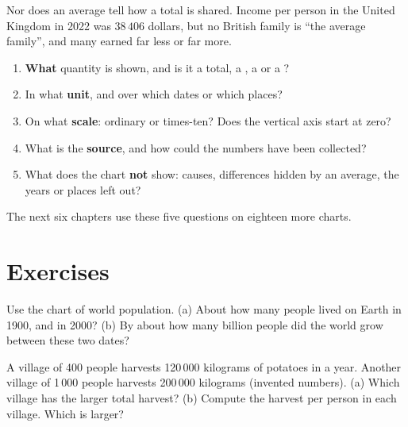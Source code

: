 Nor does an average tell how a total is shared. Income per person in the
United Kingdom in 2022 was $38\,406$ dollars, but no British family is
``the average family'', and many earned far less or far more.

\begin{method}\label{met:g6:reading-economic-charts:five}
\begin{enumerate}
  \item \textbf{What} quantity is shown, and is it a total, a , a  or a ?
  \item In what \textbf{unit}, and over which dates or which places?
  \item On what \textbf{scale}: ordinary or times-ten? Does the vertical axis
        start at zero?
  \item What is the \textbf{source}, and how could the numbers have been
        collected?
  \item What does the chart \textbf{not} show: causes, differences hidden by
        an average, the years or places left out?
\end{enumerate}
\end{method}

The next six chapters use these five questions on eighteen more charts.

\section{Exercises}

\begin{exercise}[$\star$]\label{exo:g6:reading-economic-charts:1}
Use the chart of world population. (a) About how many people lived on Earth
in 1900, and in 2000? (b) By about how many billion people did the world grow
between these two dates?
\end{exercise}

\begin{exercise}[$\star$]\label{exo:g6:reading-economic-charts:2}
A village of 400 people harvests 120\,000 kilograms of potatoes in a year.
Another village of 1\,000 people harvests 200\,000 kilograms (invented
numbers). (a) Which village has the larger total harvest? (b) Compute the
harvest per person in each village. Which is larger?
\end{exercise}

